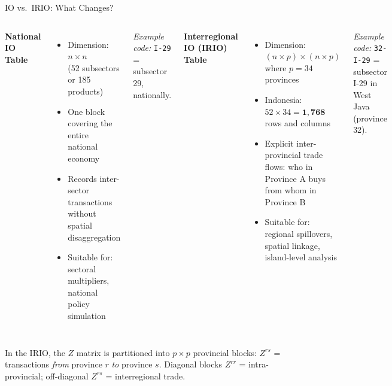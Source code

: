 \documentclass[aspectratio=169]{beamer}
\begin{document}
\begin{frame}{IO vs.\ IRIO: What Changes?}
\begin{columns}[T]
    \textbf{National IO Table}
    \begin{itemize}
      \item Dimension: $n \times n$ \\ (52 subsectors or 185 products)
      \item One block covering the entire national economy
      \item Records inter-sector transactions without spatial disaggregation
      \item Suitable for: sectoral multipliers, national policy simulation
    \end{itemize}
    \medskip
    \textit{Example code:} \texttt{I-29} = subsector 29, nationally.

    \textbf{Interregional IO (IRIO) Table}
    \begin{itemize}
      \item Dimension: $(n \times p) \times (n \times p)$ \\
            where $p = 34$ provinces
      \item Indonesia: $52 \times 34 = \mathbf{1{,}768}$ rows and columns
      \item Explicit inter-provincial trade flows: who in Province A buys from whom in Province B
      \item Suitable for: regional spillovers, spatial linkage, island-level analysis
    \end{itemize}
    \medskip
    \textit{Example code:} \texttt{32-I-29} = subsector I-29 in West Java (province 32).
\end{columns}

\medskip
\small
In the IRIO, the $Z$ matrix is partitioned into $p \times p$ provincial blocks:
$Z^{rs}$ = transactions \textit{from} province $r$ \textit{to} province $s$.
Diagonal blocks $Z^{rr}$ = intra-provincial; off-diagonal $Z^{rs}$ = interregional trade.
\end{frame}
\end{document}
